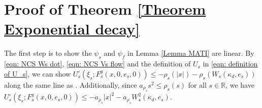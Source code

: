 \section{Proof of Theorem \ref{Theorem Exponential decay}} 
%
The first step is to show the $\psi_s$ and $\psi_f$ in Lemma \ref{Lemma MATI} are linear. By \eqref{eqn: NCS Ws dot}, \eqref{eqn: NCS Vs flow} and the definition of $U_s$ in \eqref{eqn: definition of U_s}, we can show
$
U_s^\circ(\xi_s; F_s^y(x,0,e_s, 0)) \leq - \rho_s(|x|) - \rho_s\left(W_s(\kappa_d, e_s)\right)
$
along the same line as \cite[(27)]{carnevale_stability}.
%
%
Additionally, since $a_{\rho_s} s^2 \leq \rho_s(s)$ for all $s \in \mathbb{R}$, we have $U_s^\circ(\xi_s; F_s^y(x,0,e_s, 0)) \leq -a_{\rho_s} |x|^2 - a_{\rho_s} W_s^2(\kappa_d, e_s)$.
